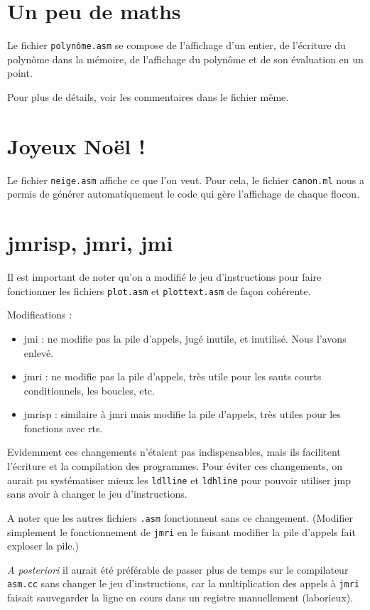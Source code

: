 \documentclass{article}
\begin{document}
\section{Un peu de maths} 

Le fichier {\tt polynôme.asm} se compose de l'affichage d'un entier, de l'écriture du polynôme dans la mémoire, de l'affichage du polynôme et de son évaluation en un point.

Pour plus de détails, voir les commentaires dans le fichier même. 

\section{Joyeux Noël !}

Le fichier {\tt neige.asm} affiche ce que l'on veut. Pour cela, le fichier {\tt canon.ml} nous a permis de générer automatiquement le code qui gère l'affichage de chaque flocon.



\section{jmrisp, jmri, jmi} 

Il est important de noter qu'on a modifié le jeu d'instructions pour faire fonctionner les fichiers {\tt plot.asm} et {\tt plottext.asm} de façon cohérente.

Modifications :
\begin{itemize}
\item jmi : ne modifie pas la pile d'appels, jugé inutile, et inutilisé. Nous l'avons enlevé.
\item jmri : ne modifie pas la pile d'appels, très utile pour les sauts courts conditionnels, les boucles, etc.
\item jmrisp : similaire à jmri mais modifie la pile d'appels, très utiles pour les fonctions avec rts.
\end{itemize}

Evidemment ces changements n'étaient pas indispensables, mais ils facilitent l'écriture et la compilation des programmes. Pour éviter ces changements, on aurait pu systématiser mieux les {\tt ldlline} et {\tt ldhline} pour pouvoir utiliser jmp sans avoir à changer le jeu d'instructions.

A noter que les autres fichiers {\tt .asm} fonctionnent sans ce changement. (Modifier simplement le fonctionnement de {\tt jmri} en le faisant modifier la pile d'appels fait exploser la pile.)

\textit{A posteriori} il aurait été préférable de passer plus de temps sur le compilateur {\tt asm.cc} sans changer le jeu d'instructions, car la multiplication des appels à {\tt jmri} faisait sauvegarder la ligne en cours dans un registre manuellement (laborieux).
\end{document}
